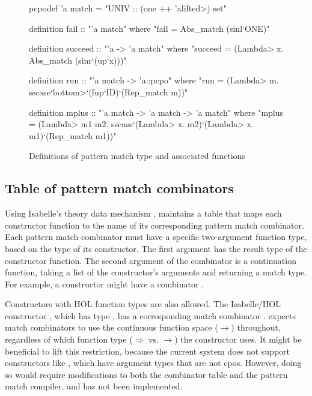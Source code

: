 \begin{figure}
\begin{isacode}
pcpodef 'a match = "UNIV :: (one ++ 'a\<lifted>) set"
\end{isacode}
\unmedskip
{}
\begin{isacode}
definition fail :: "'a match"
  where "fail = Abs_match (sinl`ONE)"
\end{isacode}
\unmedskip
{}
\begin{isacode}
definition succeed :: "'a -> 'a match"
  where "succeed = (\<Lambda> x. Abs_match (sinr`(up`x)))"
\end{isacode}
\unmedskip
{}
\begin{isacode}
definition run :: "'a match -> 'a::pcpo"
  where "run = (\<Lambda> m. sscase`\<bottom>`(fup`ID)`(Rep_match m))"
\end{isacode}
\unmedskip
{}
\begin{isacode}
definition mplus :: "'a match -> 'a match -> 'a match"
  where "mplus = (\<Lambda> m1 m2. sscase`(\<Lambda> x. m2)`(\<Lambda> x. m1)`(Rep_match m1))"
\end{isacode}
\caption{Definitions of pattern match type and associated functions}
\label{fig:match-monad-definition}
\end{figure}

\subsection{Table of pattern match combinators}
\label{sec:fixrec-impl-table}

Using Isabelle's theory data mechanism \cite{WW07}, {\fixrec} maintains a table that maps each constructor function to the name of its corresponding pattern match combinator. Each pattern match combinator must have a specific two-argument function type, based on the type of its constructor. The first argument has the result type of the constructor function. The second argument of the combinator is a continuation function, taking a list of the constructor's arguments and returning a match type. For example, a constructor  might have a combinator .

Constructors with HOL function types are also allowed. The Isabelle/HOL constructor , which has type , has a corresponding match combinator . {\fixrec} expects match combinators to use the continuous function space ($\rightarrow$) throughout, regardless of which function type ($\Rightarrow$ vs. $\rightarrow$) the constructor uses. It might be beneficial to lift this restriction, because the current system does not support constructors like , which have argument types that are not cpos. However, doing so would require modifications to both the combinator table and the pattern match compiler, and has not been implemented.

